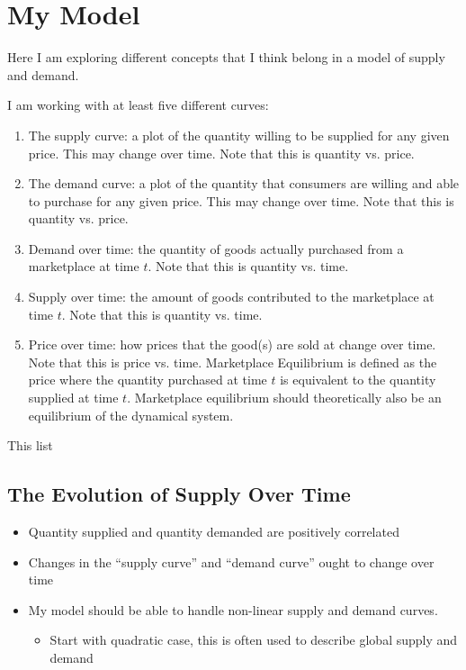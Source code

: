 \documentclass{article}
\begin{document}

\section{My Model}

Here I am exploring different concepts that I think belong in a model of supply and demand.

I am working with at least five different curves:
\begin{enumerate}
	\item The supply curve: a plot of the quantity willing to be supplied for any given price. This may change over time. Note that this is quantity vs. price.
	\item The demand curve: a plot of the quantity that consumers are willing and able to purchase for any given price. This may change over time. Note that this is quantity vs. price.
	\item Demand over time: the quantity of goods actually purchased from a marketplace at time $t$. Note that this is quantity vs. time.
	\item Supply over time: the amount of goods contributed to the marketplace at time $t$. Note that this is quantity vs. time.
	\item Price over time: how prices that the good(s) are sold at change over time. Note that this is price vs. time. Marketplace Equilibrium is defined as the price where the quantity purchased at time $t$ is equivalent to the quantity supplied at time $t$. Marketplace equilibrium should theoretically also be an equilibrium of the dynamical system. 
\end{enumerate}
This list 

\subsection{The Evolution of Supply Over Time}
\begin{itemize}
	\item Quantity supplied and quantity demanded are positively correlated
	\item Changes in the ``supply curve'' and ``demand curve'' ought to change over time
	\item My model should be able to handle non-linear supply and demand curves. 
	\begin{itemize}
		\item Start with quadratic case, this is often used to describe global supply and demand
	\end{itemize}
\end{itemize}
\end{document}
